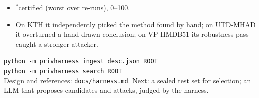 \documentclass[10pt]{article}
\newcommand{\sect}[1]{\par\vspace{4pt}{\color{acc}\bfseries #1}\par\vspace{1pt}}
\begin{document}
\begin{minipage}[t]{0.49\textwidth}
\begin{itemize}
\item[] {\footnotesize $^*$certified (worst over re-runs), 0--100.}
\item On KTH it independently picked the method found by hand; on UTD-MHAD it overturned a hand-drawn conclusion;
  on VP-HMDB51 its robustness pass caught a stronger attacker.
\end{itemize}

\sect{Run it}
{\footnotesize\texttt{python -m privharness ingest desc.json ROOT}\\\texttt{python -m privharness search ROOT}}\\[2pt]
{\footnotesize Design and references: \texttt{docs/harness.md}. Next: a sealed test set for selection; an LLM that
proposes candidates and attacks, judged by the harness.}
\end{minipage}
\end{document}
